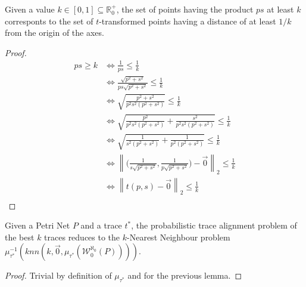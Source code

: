 \begin{lemma}
Given a value $k\in[0,1]\subseteq \mathbb{R}^+_0$, the set of points having the product $ps$ at least $k$ corresponts to the set of $t$-transformed points having a distance of at least $1/k$ from the origin of the axes.
\end{lemma}
\begin{proof}
\[\begin{aligned}
ps\geq k&\Leftrightarrow \frac{1}{ps}\leq\frac{1}{k} \\
	   &\Leftrightarrow \frac{\sqrt{p^2+s^2}}{ps\sqrt{p^2+s^2}}\leq\frac{1}{k} \\
	   &\Leftrightarrow \sqrt{\frac{p^2+s^2}{p^2s^2(p^2+s^2)}}\leq\frac{1}{k} \\
	   &\Leftrightarrow \sqrt{\frac{p^2}{p^2s^2(p^2+s^2)}+\frac{s^2}{p^2s^2(p^2+s^2)}}\leq\frac{1}{k} \\
	   &\Leftrightarrow \sqrt{\frac{1}{s^2(p^2+s^2)}+\frac{1}{p^2(p^2+s^2)}}\leq\frac{1}{k} \\
	   &\Leftrightarrow \left\|{\biggr({\frac{1}{s\sqrt{p^2+s^2}},\frac{1}{p\sqrt{p^2+s^2}}\biggr)}-\vec{0}}\right\|_2\leq\frac{1}{k} \\
	   &\Leftrightarrow \left\|t(p,s)-\vec{0}\right\|_2\leq\frac{1}{k} \\
\end{aligned}\]
\end{proof}
\begin{lemma}
Given a Petri Net $P$ and a trace $t^*$, the probabilistic trace alignment problem of the best $k$ traces reduces to the $k$-Nearest Neighbour problem $\mu_{\tau^*}^{-1}(knn(k,\vec{0},\mu_{\tau^*}(\mathcal{W}_0^{\aleph_0}(P))))$.
\end{lemma}
\begin{proof}
Trivial by definition of $\mu_{\tau^*}$ and for the previous lemma.
\end{proof}

